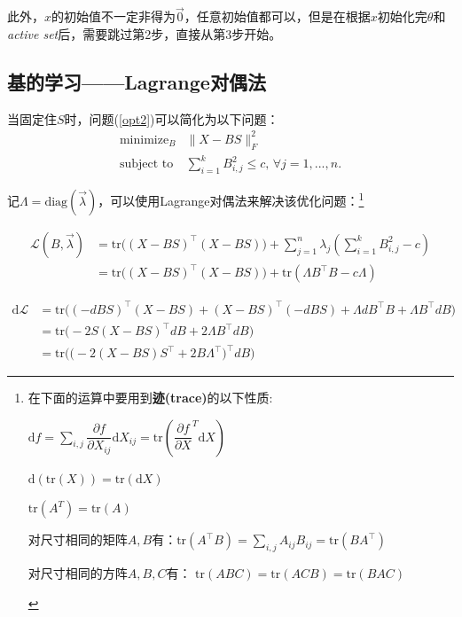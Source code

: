 此外，$x$的初始值不一定非得为$\vec{0}$，任意初始值都可以，但是在根据$x$初始化完$\theta$和\emph{active set}后，需要跳过第2步，直接从第3步开始。

\subsection{基的学习——Lagrange对偶法}
当固定住$S$时，问题(\ref{opt2})可以简化为以下问题：
\begin{equation}\label{opt5}
\begin{array}{rc}
\text{minimize}_{B} &
\|X-BS\|_F^2\\
\text{subject to}  &  \sum_{i=1}^{k}B_{i,j}^2 \leq c, \,\forall j = 1,...,n.
\end{array}
\end{equation}

记$\Lambda=\text{diag}(\vec{\lambda})$，可以使用Lagrange对偶法来解决该优化问题：\footnote{
在下面的运算中要用到\textbf{迹(trace)}的以下性质:
\begin{compactenum}
\item $\textrm{d}f=\sum_{i,j}\dfrac{\partial f}{\partial X_{ij}}\text{d}X_{ij}=\text{tr}\left(\dfrac{\partial f}{\partial X}^T\text{d}X\right)$
\item $\textrm{d}(\text{tr}(X)) = \text{tr}(\textrm{d}X)$
\item $\mathrm{tr}(A^T) = \mathrm{tr}(A)$
\item 对尺寸相同的矩阵$A,B$有：$\text{tr}(A^{\top}B)=\sum_{i,j}A_{ij}B_{ij}=\text{tr}(BA^ {\top})$
\item 对尺寸相同的方阵$A,B,C$有：
$\text{tr}(ABC)=\text{tr}(ACB)=\text{tr}(BAC)$
\end{compactenum}}



\begin{equation}\label{opt6}
\begin{array}{rl}
  \mathcal{L}(B,\vec{\lambda})&=\text{tr}\Big((X-BS)^{\top}(X-BS)\Big)
+\sum_{j=1}^{n}\lambda_j(\sum_{i=1}^{k}B_{i,j}^2-c)\\
   &= \text{tr}\Big((X-BS)^{\top}(X-BS)\Big)
+\text{tr}(\Lambda B^{\top}B-c\Lambda)
\end{array}
\end{equation}

\begin{equation}\label{opt7}
\begin{array}{rl}
  \textrm{d}\mathcal{L}&=\text{tr}\Big((-dBS)^{\top}(X-BS)
+(X-BS)^{\top}(-dBS)+\Lambda dB^{\top}B+\Lambda B^{\top}dB\Big)\\
 &=\text{tr}\Big(-2S(X-BS)^{\top}dB+2\Lambda B^{\top}dB\Big)\\
&=\text{tr}\Big(\big(-2(X-BS)S^{\top}+2 B\Lambda ^{\top}\big)^{\top}dB\Big)
\end{array}
\end{equation}

